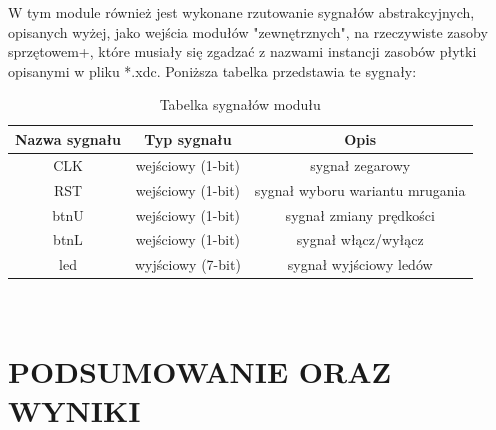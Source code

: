 \documentclass{article}
\begin{document}
W tym module również jest wykonane rzutowanie sygnałów abstrakcyjnych, opisanych wyżej, jako wejścia modułów "zewnętrznych", na rzeczywiste zasoby sprzętowem+, które musiały się
zgadzać z nazwami instancji zasobów płytki opisanymi w pliku *.xdc. Poniższa tabelka przedstawia te sygnały:
\begin{table}[H]
    \centering
    \begin{tabular}{|c|c|c|}
        \hline
        Nazwa sygnału & Typ sygnału & Opis \\
        \hline
        CLK  & wejściowy (1-bit)    & sygnał zegarowy    \\
        \hline
        RST  & wejściowy (1-bit)   & sygnał wyboru wariantu mrugania    \\
        \hline
        btnU  & wejściowy (1-bit)    & sygnał zmiany prędkości\\
        \hline
        btnL  & wejściowy (1-bit)    & sygnał włącz/wyłącz\\
        \hline
        led  & wyjściowy (7-bit)    & sygnał wyjściowy ledów\\
        \hline
    \end{tabular}\\
    \caption{Tabelka sygnałów modułu}
    \label{tab:tabela7}
\end{table}
\section{PODSUMOWANIE ORAZ WYNIKI}
\end{document}
